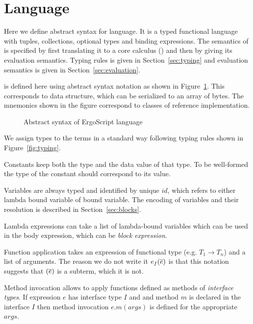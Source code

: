 \section{Language}
\label{sec:language}


Here we define abstract syntax for \langname language. It is a typed
functional language with tuples, collections, optional types and 
binding expressions. The semantics of \langname is specified by first
translating it to a core calculus (\corelang) and then by giving its
evaluation semantics. Typing rules is given in Section~\ref{sec:typing} and
evaluation semantics is given in Section~\ref{sec:evaluation}.

\langname is defined here using abstract syntax notation as shown in
Figure~\ref{fig:language}. This corresponds to  data structure,
which can be serialized to an array of bytes. The mnemonics shown in the
figure correspond to classes of  reference implementation.

\begin{figure}[h]
    \footnotesize
    
    \caption{Abstract syntax of ErgoScript language}
    \label{fig:language}
\end{figure}
    
We assign types to the terms in a standard way following typing rules shown
in Figure~\ref{fig:typing}.

Constants keep both the type and the data value of that type. To be
well-formed the type of the constant should correspond to its value.

Variables are always typed and identified by unique $id$, which refers to
either lambda bound variable of  bound variable. The encoding of
variables and their resolution is described in Section~\ref{sec:blocks}.

Lambda expressions can take a list of lambda-bound variables which can be
used in the body expression, which can be \emph{block expression}. 

Function application takes an expression of functional type (e.g. $T_1 \to
T_n$) and a list of arguments. The reason we do not write it $e_f(\overline{e})$
is that this notation suggests that $(\overline{e})$ is a subterm, which it is not.

Method invocation allows to apply functions defined as methods of
\emph{interface types}. If expression $e$ has interface type $I$ and and
method $m$ is declared in the interface $I$ then method invocation
$e.m(args)$ is defined for the appropriate $args$.

